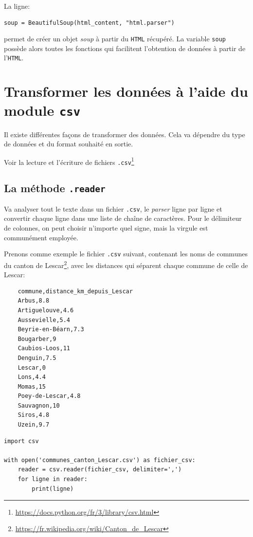 \documentclass[a4paper,12pt]{book}
\begin{document}
La ligne:
\begin{lstlisting}
soup = BeautifulSoup(html_content, "html.parser")
\end{lstlisting}
permet de créer un objet \og \textit{soup}\fg{} à partir du \texttt{HTML} récupéré. La variable \texttt{soup} possède alors toutes les fonctions qui facilitent l'obtention de données à partir de l'\texttt{HTML}.
\medskip 

\section{Transformer les données à l'aide du module \texttt{csv}}
Il existe différentes façons de transformer des données. Cela va dépendre du type de données et du format souhaité en sortie.
\medskip

Voir la lecture et l'écriture de fichiers \texttt{.csv}\footnote{\url{https://docs.python.org/fr/3/library/csv.html}}
\medskip

\subsection*{La méthode \texttt{.reader}}
Va analyser tout le texte dans un fichier \texttt{.csv}, le \textit{parser} ligne par ligne et convertir chaque ligne dans une liste de chaîne de caractères. Pour le délimiteur de colonnes, on peut choisir n'importe quel signe, mais la virgule est communément employée.
\medskip

Prenons comme exemple le fichier \texttt{.csv} suivant, contenant les noms de communes du canton de Lescar\footnote{\url{https://fr.wikipedia.org/wiki/Canton_de_Lescar}}, avec les distances qui séparent chaque commune de celle de Lescar:
\begin{verbatim}
    commune,distance_km_depuis_Lescar
    Arbus,8.8 
    Artiguelouve,4.6
    Aussevielle,5.4
    Beyrie-en-Béarn,7.3
    Bougarber,9
    Caubios-Loos,11
    Denguin,7.5
    Lescar,0
    Lons,4.4
    Momas,15
    Poey-de-Lescar,4.8
    Sauvagnon,10
    Siros,4.8
    Uzein,9.7
\end{verbatim}
\medskip

\begin{lstlisting}[caption=La méthode \texttt{.reader()}]
import csv

with open('communes_canton_Lescar.csv') as fichier_csv:
    reader = csv.reader(fichier_csv, delimiter=',')
    for ligne in reader:
        print(ligne)
\end{lstlisting}
\medskip
\end{document}
